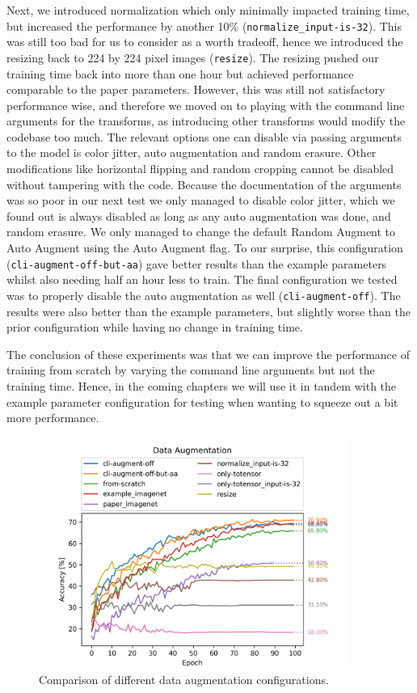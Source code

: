 \documentclass{article}
\begin{document}
Next, we introduced normalization which only minimally impacted training time, but increased the performance by another 10\% (\texttt{normalize\_input-is-32}).
This was still too bad for us to consider as a worth tradeoff, hence we introduced the resizing back to 224 by 224 pixel images (\texttt{resize}).
The resizing pushed our training time back into more than one hour but achieved performance comparable to the paper parameters.
However, this was still not satisfactory performance wise, and therefore we moved on to playing with the command line arguments for the transforms, as introducing other transforms would modify the codebase too much.
The relevant options one can disable via passing arguments to the model is color jitter, auto augmentation and random erasure.
Other modifications like horizontal flipping and random cropping cannot be disabled without tampering with the code.
Because the documentation of the arguments was so poor in our next test we only managed to disable color jitter, which we found out is always disabled as long as any auto augmentation was done, and random erasure.
We only managed to change the default Random Augment to Auto Augment using the Auto Augment flag.
To our surprise, this configuration (\texttt{cli-augment-off-but-aa}) gave better results than the example parameters whilst also needing half an hour less to train.
The final configuration we tested was to properly disable the auto augmentation as well (\texttt{cli-augment-off}).
The results were also better than the example parameters, but slightly worse than the prior configuration while having no change in training time.

The conclusion of these experiments was that we can improve the performance of training from scratch by varying the command line arguments but not the training time.
Hence, in the coming chapters we will use it in tandem with the example parameter configuration for testing when wanting to squeeze out a bit more performance.
\begin{figure}[h]
    \centering
    \includegraphics[width=0.9\textwidth]{images/data_augmentation}
    \caption{Comparison of different data augmentation configurations.}
    \label{fig:data-augmentation}
\end{figure}
\end{document}
